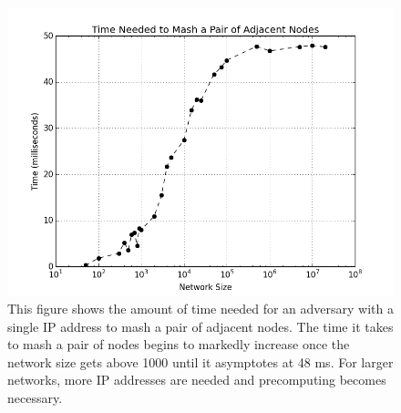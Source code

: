 \documentclass[11pt,conference]{IEEEtran}
\begin{document}
\begin{figure}
\centering
\includegraphics[width=\linewidth]{size_time}
\caption{This figure shows the amount of time needed for an adversary with a single IP address to mash a pair of adjacent nodes.  The time it takes to mash a pair of nodes begins to markedly increase once the network size gets above 1000 until it asymptotes at 48 ms.  For larger networks, more IP addresses are needed and precomputing becomes necessary.}
\label{fig:exp1}
\end{figure}
\end{document}
